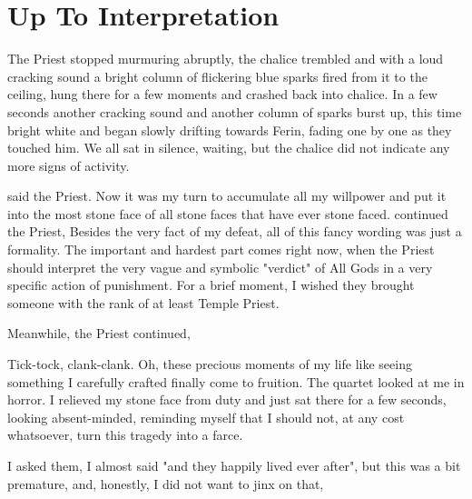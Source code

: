 \section{Up To Interpretation}

The Priest stopped murmuring abruptly, the chalice trembled and with a loud cracking sound a bright column of flickering blue sparks fired from it to the ceiling, hung there for a few moments and crashed back into chalice. In a few seconds another cracking sound and another column of sparks burst up, this time bright white and began slowly drifting towards Ferin, fading one by one as they touched him. We all sat in silence, waiting, but the chalice did not indicate any more signs of activity.

 said the Priest. Now it was my turn to accumulate all my willpower and put it into the most stone face of all stone faces that have ever stone faced.  continued the Priest,  Besides the very fact of my defeat, all of this fancy wording was just a formality. The important and hardest part comes right now, when the Priest should interpret the very vague and symbolic "verdict" of All Gods in a very specific action of punishment. For a brief moment, I wished they brought someone with the rank of at least Temple Priest.

Meanwhile, the Priest continued, 

Tick-tock, clank-clank. Oh, these precious moments of my life like seeing something I carefully crafted finally come to fruition. The quartet looked at me in horror. I relieved my stone face from duty and just sat there for a few seconds, looking absent-minded, reminding myself that I should not, at any cost whatsoever, turn this tragedy into a farce.

 I asked them,  I almost said "and they happily lived ever after", but this was a bit premature, and, honestly, I did not want to jinx on that, 

